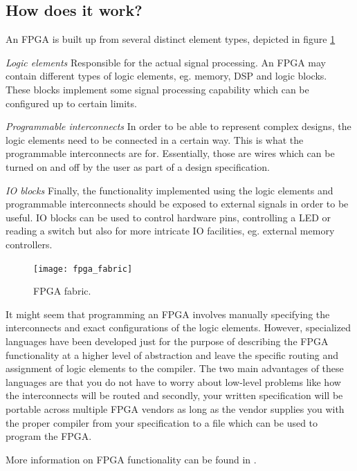 \subsection{How does it work?}
An FPGA is built up from several distinct element types, depicted in figure \ref{f:fpga_fabric}
\begin{enumeratens}
	\item \emph{Logic elements} Responsible for the actual signal processing. An FPGA may contain different types of logic elements, eg. memory, DSP and logic blocks. These blocks implement some signal processing capability which can be configured up to certain limits.
	\item \emph{Programmable interconnects} In order to be able to represent complex designs, the logic elements need to be connected in a certain way. This is what the programmable interconnects are for. Essentially, those are wires which can be turned on and off by the user as part of a design specification. 
	\item \emph{IO blocks} Finally, the functionality implemented using the logic elements and programmable interconnects should be exposed to external signals in order to be useful. IO blocks can be used to control hardware pins, controlling a LED or reading a switch but also for more intricate IO facilities, eg. external memory controllers.
\end{enumeratens}

\begin{figure}[h]
	\centering
	\texttt{[image: fpga\_fabric]}
	\caption{FPGA fabric.}
	\label{f:fpga_fabric}
\end{figure}

It might seem that programming an FPGA involves manually specifying the interconnects and exact configurations of the logic elements. However, specialized languages have been developed just for the purpose of describing the FPGA functionality at a higher level of abstraction and leave the specific routing and assignment of logic elements to the compiler. The two main advantages of these languages are that you do not have to worry about low-level problems like how the interconnects will be routed and secondly, your written specification will be portable across multiple FPGA vendors as long as the vendor supplies you with the proper compiler from your specification to a file which can be used to program the FPGA. 

More information on FPGA functionality can be found in \cite{FPGAexplained}.



